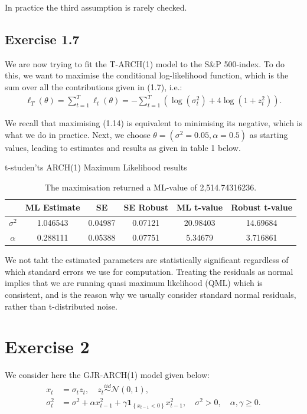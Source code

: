\documentclass[11pt,a4paper,oneside]{article}
\newcommand{\lp}{\left(}
\newcommand{\rp}{\right)}
\newcommand{\lc}{\left\{}
\newcommand{\rc}{\right\}}
\newcommand{\nnn}{\mathcal{N}}
\newcommand{\ii}{\mathbf{1}}
\newcommand{\iid}{\overset{iid}{\sim}}
\newcommand{\sumt}{\sum_{t=1}^T}
\begin{document}
In practice the third assumption is rarely checked.

\subsection{Exercise 1.7}
We are now trying to fit the T-ARCH(1) model to the S\&P 500-index. To do this, we want to maximise the conditional log-likelihood function, which is the sum over all the contributions given in (1.7), i.e.:
\begin{align}
    \ell_T\lp \theta\rp = \sumt \ell_t \lp \theta \rp = - \sumt \lp \log\lp \sigma_t^2\rp + 4 \log \lp 1 + z_t^2\rp\rp.
\end{align}

We recall that maximising (1.14) is equivalent to minimising its negative, which is what we do in practice. Next, we choose $\theta = \lp \sigma^2 = 0.05, \alpha = 0.5\rp$ as starting values, leading to estimates and results as given in table 1 below.
\begin{table}[ht]
    \centering
    \caption{t-studen'ts ARCH(1) Maximum Likelihood results}
    \begin{tabular}{c|ccccc}  
    \toprule
                    & ML Estimate   &   SE      &   SE Robust   &   ML t-value  &   Robust t-value
    \\ \midrule
        $\sigma^2$  &  1.046543     &   0.04987 &   0.07121     &   20.98403    &   14.69684
    \\
        $\alpha$    &  0.288111     &   0.05388 &   0.07751     &   5.34679     &   3.716861
    \\ \midrule
    \end{tabular}
    \label{tab:ml_t_arch}
    \caption*{The maximisation returned a ML-value of 2,514.74316236.}
\end{table}

We not taht the estimated parameters are statistically significant regardless of which standard errors we use for computation. Treating the residuals as normal implies that we are running quasi maximum likelihood (QML) which is consistent, and is the reason why we usually consider standard normal residuals, rather than t-distributed noise.

\clearpage
\section{Exercise 2}
We consider here the GJR-ARCH(1) model given below:
\begin{align}
    x_t 
        &= \sigma_t z_t, \quad z_t \iid \nnn\lp 0, 1\rp, \\
    \sigma_t^2 
        &= \sigma^2 + \alpha x_{t-1}^2 + \gamma \ii_{\lc x_{t-1} < 0\rc} x_{t-1}^2, \quad \sigma^2 > 0, \quad \alpha, \gamma \geq 0.
\end{align}
\end{document}
